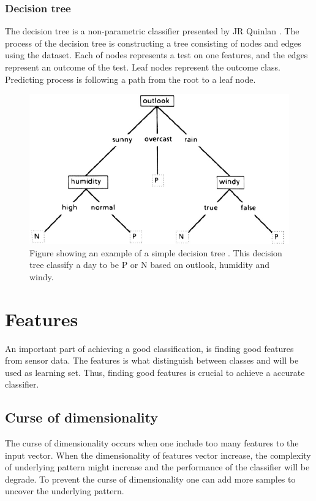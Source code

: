 \documentclass[USenglish]{ifimaster}  %
\begin{document}
	
	\subsubsection{Decision tree}
	The decision tree is a non-parametric classifier presented by JR Quinlan \cite{Quinlan1986}. The process of the decision tree is constructing a tree consisting of nodes and edges using the dataset. Each of nodes represents a test on one features, and the edges represent an outcome of the test. Leaf nodes represent the outcome class. Predicting process is following a path from the root to a leaf node.
	
	
	\begin{figure}[h]
		\centering
		\includegraphics[scale=0.5]{Figures/decisionTree.PNG}
		\caption{Figure showing an example of a simple decision tree \cite{Quinlan1986}. This decision tree classify a day to be P or N based on outlook, humidity and windy.}
		\label{fig:SVM}
	\end{figure}
	
	
	\section{Features} \label{features}
	An important part of achieving a good classification, is finding good features from sensor data. The features is what distinguish between classes and will be used as learning set. Thus, finding good features is crucial to achieve a accurate classifier.
	
	\subsection{Curse of dimensionality}\label{curseDim}
	The curse of dimensionality occurs when one include too many features to the input vector. When the dimensionality of features vector increase, the complexity of underlying pattern might increase and the performance of the classifier will be degrade. To prevent the curse of dimensionality one can add more samples to uncover the underlying pattern.
	
\end{document}
